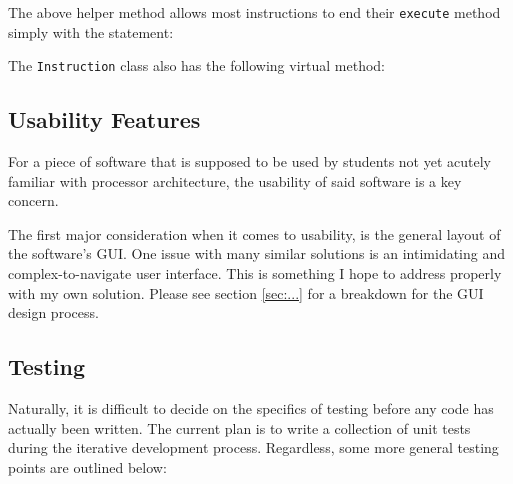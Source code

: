     The above helper method allows most instructions to end their \texttt{execute} method simply with the statement: 

    The \texttt{Instruction} class also has the following virtual method: 

\subsection{Usability Features}
    For a piece of software that is supposed to be used by students not yet acutely familiar with processor architecture, the usability of said software is a key concern.

    The first major consideration when it comes to usability, is the general layout of the software's GUI. One issue with many similar solutions is an intimidating and complex-to-navigate user interface. This is something I hope to address properly with my own solution. Please see section \ref{sec:...} for a breakdown for the GUI design process.

\subsection{Testing}
    Naturally, it is difficult to decide on the specifics of testing before any code has actually been written. The current plan is to write a collection of unit tests during the iterative development process. Regardless, some more general testing points are outlined below:
